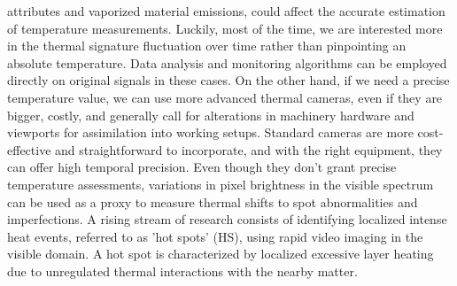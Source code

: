 attributes and vaporized material emissions, could affect the accurate estimation of temperature measurements. Luckily, most of the time, we are interested more in the thermal signature fluctuation over time rather than pinpointing an absolute temperature. Data analysis and monitoring algorithms can be employed directly on original signals in these cases. On the other hand, if we need a precise temperature value, we can use more advanced thermal cameras, even if they are bigger, costly, and generally call for alterations in machinery hardware and viewports for assimilation into working setups. Standard cameras are more cost-effective and straightforward to incorporate, and with the right equipment, they can offer high temporal precision. Even though they don't grant precise temperature assessments, variations in pixel brightness in the visible spectrum can be used as a proxy to measure thermal shifts to spot abnormalities and imperfections. A rising stream of research consists of identifying localized intense heat events, referred to as 'hot spots' (HS), using rapid video imaging in the visible domain. A hot spot is characterized by localized excessive layer heating due to unregulated thermal interactions with the nearby matter.
